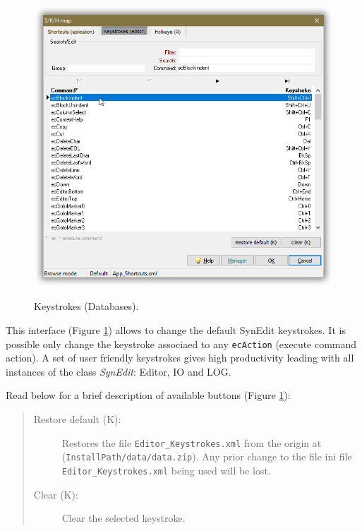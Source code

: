 \begin{figure}[H]
  \includegraphics[scale=0.35]{./res/skh_map_keystrokes_dlg.png}\\
  \caption{Keystrokes (Databases).}
  \label{fig:keystrokes_dlg}
\end{figure}

This interface
(Figure \ref{fig:keystrokes_dlg})
allows to change the default SynEdit keystrokes.
It is possible only change the keystroke associaed to any \texttt{ecAction} (execute command action).
A set of user friendly keystrokes gives high productivity leading with
all instances of the class \textit{SynEdit}: Editor, IO and LOG.

Read below for a brief description of available buttons (Figure \ref{fig:keystrokes_dlg}):

\begin{quote}
  \begin{footnotesize}
    \begin{description}
      \item[Restore default (K):]
        Restores the file \texttt{Editor\_Keystrokes.xml} from the origin at
        (\texttt{InstallPath/data/data.zip}). Any prior change to the file ini file
        \texttt{Editor\_Keystrokes.xml} being used will be lost.
      \item[Clear (K):]
        Clear the selected keystroke.
    \end{description}
  \end{footnotesize}
\end{quote}


